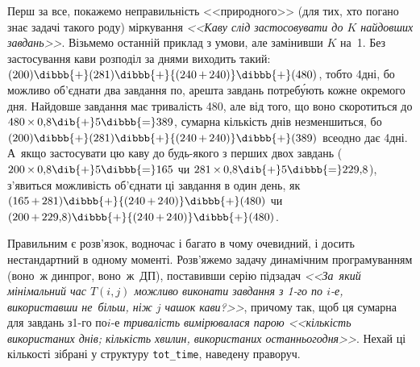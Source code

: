 \Tutorial	Перш за все, покажемо неправильність <<природного>> (для тих, хто погано знає задачі такого роду) міркування \textsl{<<Каву слід застосовувати до $K$ найдовших завдань>>}. Візьмемо останній приклад з умови, але замінивши $K$ на~1. Без застосування кави розподіл за днями виходить такий: $(200)\dibbb{{+}}(281)\dibbb{{+}}{(240\,{+}\,240)}\dibbb{{+}}(480)$, тобто 4\nolinebreak[3] дні, бо можливо об'єднати два завдання по, а\nolinebreak[2] решта завдань потреб\'{у}ють кожне окремого дня. Найдовше завдання має тривалість 480, але від того, що воно скоротиться до ${480\,{\times}\,0{,}8}\dib{{+}}5\dibbb{{=}}389$, сумарна кількість днів не\nolinebreak[3] зменшиться, бо $(200)\dibbb{{+}}(281)\dibbb{{+}}{(240\,{+}\,240)}\dibbb{{+}}(389)$ все\nolinebreak[3] одно дає 4\nolinebreak[3] дні. А~якщо застосувати цю каву до будь-якого з перших двох завдань (${200\,{\times}\,0{,}8}\dib{{+}}5\dibbb{{=}}165$ чи ${281\,{\times}\,0{,}8}\dib{{+}}5\dibbb{{=}}229{,}8$), з'явиться можливість об'єднати ці завдання в один день, як ${(165\,{+}\,281)}\dibbb{{+}}{(240\,{+}\,240)}\dibbb{{+}}(480)$ чи ${(200\,{+}\,229{,}8)}\dibbb{{+}}{(240\,{+}\,240)}\dibbb{{+}}(480)$.


Правильним є %
розв'язок, водночас і багато в чому очевидний, і досить нестандартний в одному моменті. Розв'яжемо задачу динамічним програмуванням (воно~ж динпрог, воно~ж~ДП), поставивши серію підзадач \textsl{<<За~який мінімальний час $T(i,j)$ можливо виконати завдання з \mbox{1-го} по \mbox{$i$-е}, використавши не~більш, ніж $j$ чашок кави?>>}, причому так, щоб ця сумарна для завдань з\nolinebreak[3] \mbox{1-го} по\nolinebreak[3] \mbox{$i$-е} \textsl{тривалість вимірювалася парою <<кількість використаних днів; кількість хвилин, використаних останнього\nolinebreak[2] дня>>}. 
%
Нехай ці кількості зібрані у структуру \verb"tot_time", наведену праворуч.

